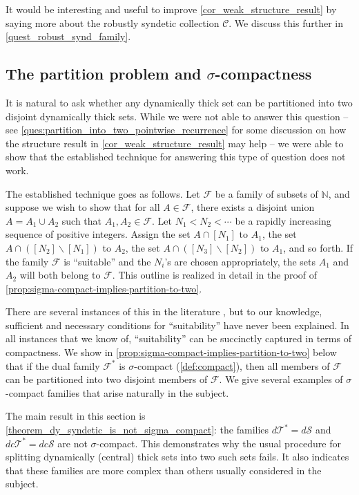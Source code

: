 \documentclass[letter,11pt]{article}
\theoremstyle{plain}
\theoremstyle{definition}
\theoremstyle{plain}
\theoremstyle{plain}
\numberwithin{equation}{section}
\newcommand{\N}{\mathbb{N}}
\renewcommand{\setminus}{\backslash}
\newcommand{\dsyndetic}{d\mathcal{S}}
\newcommand{\dthick}{d\mathcal{T}}
\newcommand{\dcsyndetic}{dc\mathcal{S}}
\newcommand{\dcthick}{dc\mathcal{T}}
\newcommand{\family}{\mathscr{F}}
\newcommand{\collection}{\mathscr{C}}
\begin{document}
It would be interesting and useful to improve \cref{cor_weak_structure_result} by saying more about the robustly syndetic collection $\collection$.  We discuss this further in \cref{quest_robust_synd_family}.



\subsection{The partition problem and \texorpdfstring{$\sigma$}{sigma}-compactness}
\label{sec:sigma-compact}

It is natural to ask whether any dynamically thick set can be partitioned into two disjoint dynamically thick sets.  While we were not able to answer this question -- see \cref{ques:partition_into_two_pointwise_recurrence} for some discussion on how the structure result in \cref{cor_weak_structure_result} may help -- we were able to show that the established technique for answering this type of question does not work.

The established technique goes as follows.  Let $\family$ be a family of subsets of $\N$, and suppose we wish to show that for all $A \in \family$, there exists a disjoint union $A = A_1 \cup A_2$ such that $A_1, A_2 \in \family$.  Let $N_1 < N_2 < \cdots$ be a rapidly increasing sequence of positive integers.  Assign the set $A \cap [N_1]$ to $A_1$, the set $A \cap ([N_2] \setminus [N_1])$ to $A_2$, the set $A \cap ([N_3] \setminus [N_2])$ to $A_1$, and so forth.  If the family $\family$ is ``suitable'' and the $N_i$'s are chosen appropriately, the sets $A_1$ and $A_2$ will both belong to $\family$. This outline is realized in detail in the proof of \cref{prop:sigma-compact-implies-partition-to-two}.

There are several instances of this in the literature \cite{Forrest_recurrence-in-dynamical-systems,Le-interpolation-first,Le_interpolation_for_nilsequences}, but to our knowledge, sufficient and necessary conditions for ``suitability'' have never been explained.  In all instances that we know of, ``suitability'' can be succinctly captured in terms of compactness.  We show in \cref{prop:sigma-compact-implies-partition-to-two} below that if the dual family $\family^*$ is $\sigma$-compact (\cref{def:compact}), then all members of $\family$ can be partitioned into two disjoint members of $\family$.  We give several examples of $\sigma$-compact families that arise naturally in the subject.

The main result in this section is \cref{theorem_dy_syndetic_is_not_sigma_compact}: the families $\dthick^* = \dsyndetic$ and $\dcthick^* = \dcsyndetic$ are not $\sigma$-compact.  This demonstrates why the usual procedure for splitting dynamically (central) thick sets into two such sets fails.  It also indicates that these families are more complex than others usually considered in the subject. 
\end{document}
